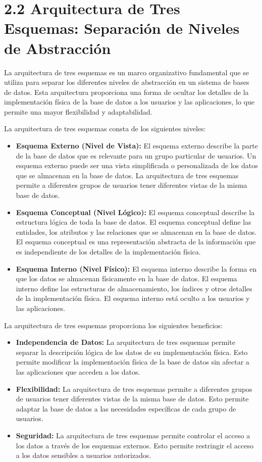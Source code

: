 \section{2.2 Arquitectura de Tres Esquemas: Separación de Niveles de Abstracción}

La arquitectura de tres esquemas es un marco organizativo fundamental que se utiliza para separar los diferentes niveles de abstracción en un sistema de bases de datos. Esta arquitectura proporciona una forma de ocultar los detalles de la implementación física de la base de datos a los usuarios y las aplicaciones, lo que permite una mayor flexibilidad y adaptabilidad.

La arquitectura de tres esquemas consta de los siguientes niveles:

\begin{itemize}
    \item \textbf{Esquema Externo (Nivel de Vista):} El esquema externo describe la parte de la base de datos que es relevante para un grupo particular de usuarios. Un esquema externo puede ser una vista simplificada o personalizada de los datos que se almacenan en la base de datos. La arquitectura de tres esquemas permite a diferentes grupos de usuarios tener diferentes vistas de la misma base de datos.
    \item \textbf{Esquema Conceptual (Nivel Lógico):} El esquema conceptual describe la estructura lógica de toda la base de datos. El esquema conceptual define las entidades, los atributos y las relaciones que se almacenan en la base de datos. El esquema conceptual es una representación abstracta de la información que es independiente de los detalles de la implementación física.
    \item \textbf{Esquema Interno (Nivel Físico):} El esquema interno describe la forma en que los datos se almacenan físicamente en la base de datos. El esquema interno define las estructuras de almacenamiento, los índices y otros detalles de la implementación física. El esquema interno está oculto a los usuarios y las aplicaciones.
\end{itemize}

La arquitectura de tres esquemas proporciona los siguientes beneficios:

\begin{itemize}
    \item \textbf{Independencia de Datos:} La arquitectura de tres esquemas permite separar la descripción lógica de los datos de su implementación física. Esto permite modificar la implementación física de la base de datos sin afectar a las aplicaciones que acceden a los datos.
    \item \textbf{Flexibilidad:} La arquitectura de tres esquemas permite a diferentes grupos de usuarios tener diferentes vistas de la misma base de datos. Esto permite adaptar la base de datos a las necesidades específicas de cada grupo de usuarios.
    \item \textbf{Seguridad:} La arquitectura de tres esquemas permite controlar el acceso a los datos a través de los esquemas externos. Esto permite restringir el acceso a los datos sensibles a usuarios autorizados.
\end{itemize}

